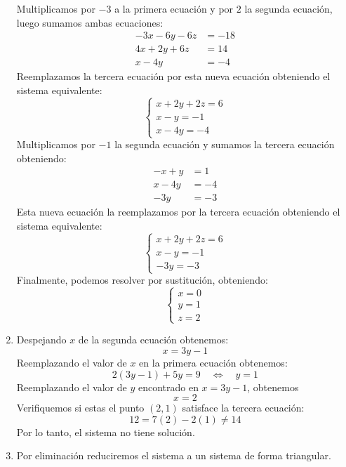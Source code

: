 \documentclass[11pt,respuestas,a4]{aleph-examen}
\begin{document}
\begin{preguntas}
\begin{respuesta}
\begin{enumerate}[label=\textit{\alph*)}]
        Multiplicamos por $-3$ a la primera ecuaci\'on y por $2$ la segunda ecuaci\'on, luego sumamos ambas ecuaciones:
        $$
        \begin{aligned}
        	-3 x - 6y - 6 z &= -18 \\
        	4x + 2y + 6z &= 14 \\ \hline 
        	x - 4y &= -4
        \end{aligned}
        $$
        Reemplazamos la tercera ecuaci\'on por esta nueva ecuaci\'on obteniendo el sistema equivalente:
        $$
        \begin{cases}
        	x + 2y  + 2z = 6 \\
        	x - y = -1 \\
        	x - 4y = -4
        \end{cases}
        $$
        Multiplicamos por $-1$ la segunda ecuaci\'on y sumamos la tercera ecuaci\'on obteniendo:
        $$
        \begin{aligned}
        	-x + y &= 1 \\
        	x - 4y &= -4 \\ \hline
        	-3y &= -3
        \end{aligned}
        $$
        Esta nueva ecuaci\'on la reemplazamos por la tercera ecuaci\'on obteniendo el sistema equivalente:
        $$
        \begin{cases}
        	x + 2y  + 2z = 6 \\
        	x - y = -1 \\
        	 -3y = -3
        \end{cases}
        $$
        Finalmente, podemos resolver por sustituci\'on, obteniendo:
        $$
        \begin{cases}
        	x = 0 \\
        	y = 1 \\
        	z = 2
        \end{cases}
        $$
        \item Despejando $x$ de la segunda ecuaci\'on obtenemos:
        $$
        x = 3y - 1
        $$
        Reemplazando el valor de $x$ en la primera ecuaci\'on obtenemos:
        $$
        2(3y-1) + 5y = 9 \quad \Longleftrightarrow \quad y = 1
        $$
        Reemplazando el valor de $y$ encontrado en $x = 3y-1$, obtenemos
        $$
        x = 2
        $$
        Verifiquemos si estas el punto $(2,1)$ satisface la tercera ecuaci\'on:
        $$
        12 = 7(2) - 2(1) \neq 14
        $$
        Por lo tanto, el sistema no tiene soluci\'on.
        \item Por eliminaci\'on reduciremos el sistema a un sistema de forma triangular. 
        

\end{enumerate}
\end{respuesta}
\end{preguntas}
\end{document}
